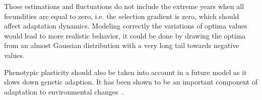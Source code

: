 Those estimations and fluctuations do not include the extreme years when all fecundities are equal to zero, i.e. the selection gradient is zero, which should affect adaptation dynamics. Modeling correctly the variations of optima values would lead to more realistic behavior, it could be done by drawing the optima from an almost Gaussian distribution with a very long tail towards negative values.

Phenotypic plasticity should also be taken into account in a future model as it slows down genetic adaption. It has been shown to be an important component of adaptation to environmental changes~\citep{aitken_adaptation_2008}.